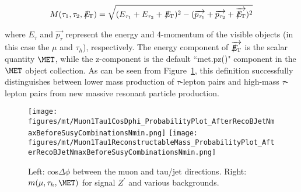 \begin{equation}
   M(\tau_{1},\tau_{2},{E\!\!\!\!/_{\rm T}}) = \sqrt{(E_{\tau_{1}}+E_{\tau_{2}}+{E\!\!\!\!/_{\rm
T}})^{2}-(\overrightarrow{p_{\tau_{1}}}+\overrightarrow{p_{\tau_{2}}}+\overrightarrow{{E\!\!\!\!/_{\rm T}}})^{2}}
\label{eq:ditaumass}
\end{equation}

where $E_{\tau}$ and $\overrightarrow{p_{\tau}}$ represent the energy and 4-momentum of the visible objects (in this case the $\mu$ and $\tau_{h}$), respectively. 
The energy component of $\overrightarrow{{E\!\!\!\!/_{\rm T}}}$ is the scalar quantity $\MET$, while the z-component is the default ``met.pz()" component in the 
$\MET$ object collection. 
As can be seen from Figure~\ref{fig:MuTauMass}, this definition successfully distinguishes 
between lower mass production of $\tau$-lepton pairs and high-mass $\tau$-lepton pairs from new massive resonant particle production.

\begin{figure}\centering
  \texttt{[image: figures/mt/Muon1Tau1CosDphi\_ProbabilityPlot\_AfterRecoBJetNmaxBeforeSusyCombinationsNmin.png]}
  \texttt{[image: figures/mt/Muon1Tau1ReconstructableMass\_ProbabilityPlot\_AfterRecoBJetNmaxBeforeSusyCombinationsNmin.png]}
  \caption{\label{fig:MuTauMass} Left: cos$\Delta \phi$ between the muon and tau/jet directions.  Right: $m(\mu,\tau_{h},\MET)$ for signal $Z^{\prime}$ 
and various backgrounds.}
\end{figure}

